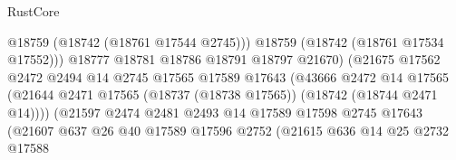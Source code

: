 \begin{lexlean}{RustCore}
\begin{coremodule}
                                              @18759
                                              (@18742 (@18761 @17544 @2745)))
                                            @18759
                                            (@18742 (@18761 @17534 @17552)))
                                          @18777
                                          @18781
                                          @18786
                                          @18791
                                          @18797
                                          @21670)
                                        (@21675
                                          @17562
                                          @2472
                                          @2494
                                          @14
                                          @2745
                                          @17565
                                          @17589
                                          @17643
                                          (@43666
                                            @2472
                                            @14
                                            @17565
                                            (@21644
                                              @2471
                                              @17565
                                              (@18737 (@18738 @17565))
                                              (@18742 (@18744 @2471 @14))))
                                          (@21597
                                            @2474
                                            @2481
                                            @2493
                                            @14
                                            @17589
                                            @17598
                                            @2745
                                            @17643
                                            (@21607
                                              @637
                                              @26
                                              @40
                                              @17589
                                              @17596
                                              @2752
                                              (@21615
                                                @636
                                                @14
                                                @25
                                                @2732
                                                @17588

\end{coremodule}
\end{lexlean}
